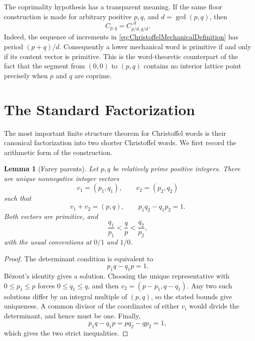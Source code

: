\documentclass{book}
\newtheorem{lemma}[definition]{Lemma}
\begin{document}
The coprimality hypothesis has a transparent meaning.  If the same floor
construction is made for arbitrary positive \(p,q\), and
\(d=\gcd(p,q)\), then
\begin{equation}\label{eq:ChristoffelPower}
  C_{p,q}=C_{p/d,q/d}^{,d}.
\end{equation}
Indeed, the sequence of increments in
\eqref{eq:ChristoffelMechanicalDefinition} has period \((p+q)/d\).
Consequently a lower mechanical word is primitive if and only if its
content vector is primitive.  This is the word-theoretic counterpart of
the fact that the segment from \((0,0)\) to \((p,q)\) contains no interior
lattice point precisely when \(p\) and \(q\) are coprime.

\section{The Standard Factorization}

The most important finite structure theorem for Christoffel words is their
canonical factorization into two shorter Christoffel words.  We first
record the arithmetic form of the construction.

\begin{lemma}[Farey parents]\label{lemma:ChristoffelFareyParents}
  Let \(p,q\) be relatively prime positive integers.  There are unique
  nonnegative integer vectors
  \[
    v_1=(p_1,q_1),\qquad v_2=(p_2,q_2)
  \]
  such that
  \[
    v_1+v_2=(p,q),
    \qquad p_1q_2-q_1p_2=1.
  \]
  Both vectors are primitive, and
  \[
    \frac{q_1}{p_1}<\frac qp<\frac{q_2}{p_2},
  \]
  with the usual conventions at \(0/1\) and \(1/0\).
\end{lemma}
\begin{proof}
  The determinant condition is equivalent to
  \[
    p_1q-q_1p=1.
  \]
  B\'ezout's identity gives a solution.  Choosing the unique representative
  with \(0\leq p_1\leq p\) forces \(0\leq q_1\leq q\), and then
  \(v_2=(p-p_1,q-q_1)\).  Any two such solutions differ by an integral
  multiple of \((p,q)\), so the stated bounds give uniqueness.  A common
  divisor of the coordinates of either \(v_i\) would divide the
  determinant, and hence must be one.  Finally,
  \[
    p_1q-q_1p=pq_2-qp_2=1,
  \]
  which gives the two strict inequalities.
\end{proof}
\end{document}
